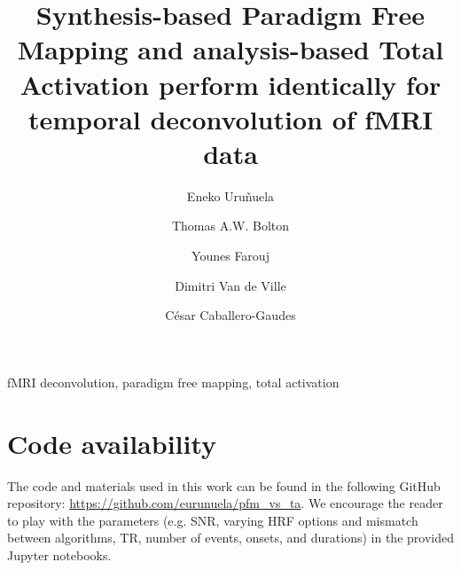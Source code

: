 \documentclass[5p]{elsarticle}
\begin{document}
\begin{frontmatter}

\title{Synthesis-based Paradigm Free Mapping and analysis-based Total Activation perform identically for temporal deconvolution of fMRI data}

\author[bcbl,upv]{Eneko Uru\~nuela}

\author[japan]{Thomas A.W. Bolton}
\author[epfl]{Younes Farouj}
\author[epfl,unige]{Dimitri Van de Ville}
\author[bcbl]{C\'{e}sar Caballero-Gaudes}

\address[bcbl]{Basque Center on Cognition, Brain and Language (BCBL), Donostia-San Sebasti\'{a}n, Spain.}
\address[upv]{University of the Basque Country (EHU/UPV), Donostia-San Sebasti\'{a}n, Spain.}
\address[japan]{Department of Decoded Neurofeedback, ATR Computational Neuroscience Laboratories, Kyoto, Japan}
\address[epfl]{Swiss Federal Institute of Technology Lausanne (EPFL), Lausanne, Switzerland.}
\address[unige]{Faculty of Medicine of the University of Geneva, Geneva, Switzerland}

\begin{abstract}

\end{abstract}

\begin{keyword}
fMRI deconvolution, paradigm free mapping, total activation
\end{keyword}

\end{frontmatter}

\linenumbers









\section{Code availability}

The code and materials used in this work can be found in the following GitHub repository: \url{https://github.com/eurunuela/pfm_vs_ta}. We encourage the reader to play with the parameters (e.g. SNR, varying HRF options and mismatch between algorithms, TR, number of events, onsets, and durations) in the provided Jupyter notebooks.
\end{document}
